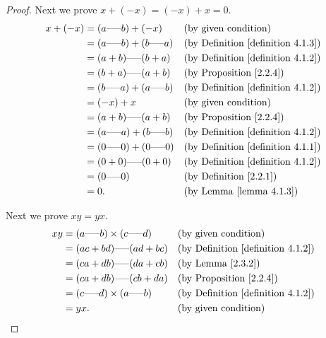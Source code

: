 \begin{proof}
Next we prove \(x + (-x) = (-x) + x = 0\).
\begin{align*}
x + (-x) &= (a \text{-----} b) + (-x) && \text{(by given condition)} \\
&= (a \text{-----} b) + (b \text{-----} a) && \text{(by Definition \ref{definition 4.1.3})} \\
&= (a + b) \text{-----} (b + a) && \text{(by Definition \ref{definition 4.1.2})} \\
&= (b + a) \text{-----} (a + b) && \text{(by Proposition \ref{2.2.4})} \\
&= (b \text{-----} a) + (a \text{-----} b) && \text{(by Definition \ref{definition 4.1.2})} \\
&= (-x) + x && \text{(by given condition)} \\
&= (a + b) \text{-----} (a + b) && \text{(by Proposition \ref{2.2.4})} \\
&= (a \text{-----} a) + (b \text{-----} b) && \text{(by Definition \ref{definition 4.1.2})} \\
&= (0 \text{-----} 0) + (0 \text{-----} 0) && \text{(by Definition \ref{definition 4.1.1})} \\
&= (0 + 0) \text{-----} (0 + 0) && \text{(by Definition \ref{definition 4.1.2})} \\
&= (0 \text{-----} 0) && \text{(by Definition \ref{2.2.1})} \\
&= 0. && \text{(by Lemma \ref{lemma 4.1.3})}
\end{align*}

Next we prove \(xy = yx\).
\begin{align*}
xy &= (a \text{-----} b) \times (c \text{-----} d) && \text{(by given condition)} \\
&= (ac + bd) \text{-----} (ad + bc) && \text{(by Definition \ref{definition 4.1.2})} \\
&= (ca + db) \text{-----} (da + cb) && \text{(by Lemma \ref{2.3.2})} \\
&= (ca + db) \text{-----} (cb + da) && \text{(by Proposition \ref{2.2.4})} \\
&= (c \text{-----} d) \times (a \text{-----} b) && \text{(by Definition \ref{definition 4.1.2})} \\
&= yx. && \text{(by given condition)}
\end{align*}


\end{proof}
